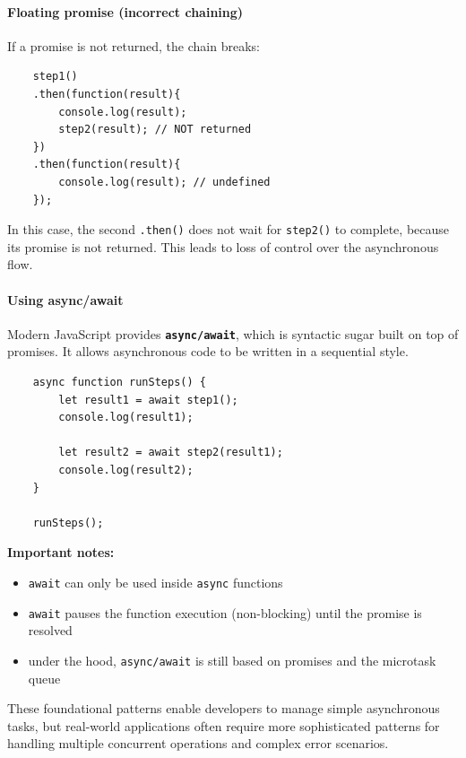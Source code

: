 \documentclass{scrbook}
\begin{document}
\paragraph{Floating promise (incorrect chaining)}

If a promise is not returned, the chain breaks:

\begin{lstlisting}
    step1()
    .then(function(result){
        console.log(result);
        step2(result); // NOT returned
    })
    .then(function(result){
        console.log(result); // undefined
    });
\end{lstlisting}

In this case, the second \texttt{.then()} does not wait for \texttt{step2()} to complete, because its promise is not returned. This leads to loss of control over the asynchronous flow.

\paragraph{Using async/await}

Modern JavaScript provides \texttt{\textbf{async/await}}, which is syntactic sugar built on top of promises. It allows asynchronous code to be written in a sequential style.

\begin{lstlisting}
    async function runSteps() {
        let result1 = await step1();
        console.log(result1);
    
        let result2 = await step2(result1);
        console.log(result2);
    }
    
    runSteps();
\end{lstlisting}

\textbf{Important notes:}
\begin{itemize}
    \item \texttt{await} can only be used inside \texttt{async} functions
    \item \texttt{await} pauses the function execution (non-blocking) until the promise is resolved
    \item under the hood, \texttt{async/await} is still based on promises and the microtask queue
\end{itemize}

These foundational patterns enable developers to manage simple asynchronous tasks, but real-world applications often require more sophisticated patterns for handling multiple concurrent operations and complex error scenarios.
\end{document}
